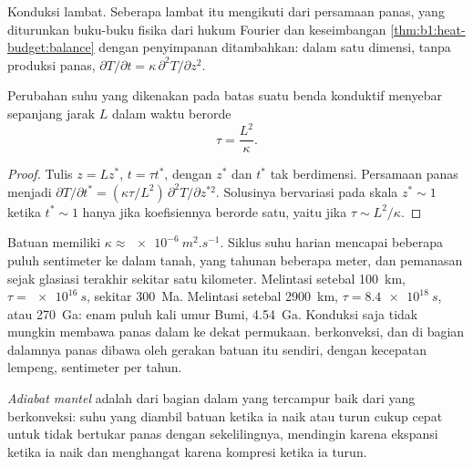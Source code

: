Konduksi lambat. Seberapa lambat itu mengikuti dari persamaan panas, yang diturunkan buku-buku fisika dari hukum Fourier dan keseimbangan \cref{thm:b1:heat-budget:balance} dengan penyimpanan ditambahkan: dalam satu dimensi, tanpa produksi panas,
$\partial T/\partial t = \kappa\,\partial^2 T/\partial z^2$.

\begin{proposition}\label{prop:b1:heat-budget:timescale}
Perubahan suhu yang dikenakan pada batas suatu benda konduktif menyebar sepanjang jarak $L$ dalam waktu berorde
\[
  \tau = \frac{L^2}{\kappa} .
\]
\end{proposition}

\begin{proof}
Tulis $z = L z^*$, $t = \tau t^*$, dengan $z^*$ dan $t^*$ tak berdimensi. Persamaan panas menjadi $\partial T/\partial t^* = (\kappa\tau/L^2)\,\partial^2
T/\partial z^{*2}$. Solusinya bervariasi pada skala $z^* \sim 1$ ketika $t^* \sim 1$ hanya jika koefisiennya berorde satu, yaitu jika $\tau \sim L^2/\kappa$.
\end{proof}

Batuan memiliki $\kappa \approx \qty{e-6}{m^2.s^{-1}}$. Siklus suhu harian mencapai beberapa puluh sentimeter ke dalam tanah, yang tahunan beberapa meter, dan pemanasan sejak glasiasi terakhir sekitar satu kilometer. Melintasi  setebal \qty{100}{km}, $\tau = \qty{e16}{s}$, sekitar \qty{300}{Ma}. Melintasi  setebal \qty{2900}{km}, $\tau = \qty{8.4e18}{s}$, atau \qty{270}{Ga}: enam puluh kali umur Bumi, \qty{4.54}{Ga}. %
Konduksi saja tidak mungkin membawa panas  dalam ke dekat permukaan.  berkonveksi, dan di bagian dalamnya panas dibawa oleh gerakan batuan itu sendiri, dengan kecepatan lempeng, sentimeter per tahun. %

\begin{definition}\label{def:b1:heat-budget:adiabat}
\emph{Adiabat mantel} adalah  dari bagian dalam yang tercampur baik dari  yang berkonveksi: suhu yang diambil batuan  ketika ia naik atau turun cukup cepat untuk tidak bertukar panas dengan sekelilingnya, mendingin karena ekspansi ketika ia naik dan menghangat karena kompresi ketika ia turun.
\end{definition}

